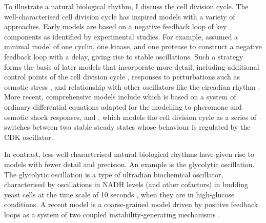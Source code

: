 To illustrate a natural biological rhythm, I discuss the cell division cycle.
The well-characterised cell division cycle has inspired models with a variety of approaches.
Early models are based on a negative feedback loop of key components as identified by experimental studies.
For example, \textcite{goldbeterMinimalCascadeModel1991} assumed a minimal model of one cyclin, one kinase, and one protease to construct a negative feedback loop with a delay, giving rise to stable oscillations.
Such a strategy forms the basis of later models that incorporate more detail, including additional control points of the cell division cycle \parencite{chenIntegrativeAnalysisCell2004}, responses to perturbations such as osmotic stress \parencite{adroverTimeDependentQuantitativeMulticomponent2011}, and relationship with other oscillators like the circadian rhythm \parencite{gerardEntrainmentMammalianCell2012, charvinForcedPeriodicExpression2009, droinLowdimensionalDynamicsTwo2019}.
More recent, comprehensive models include \textcite{adlerYeastCellCycle2022} which is based on a system of ordinary differential equations adapted for the modelling to pheromone and osmotic shock responses, and \textcite{novakMitoticKinaseOscillation2022}, which models the cell division cycle as a series of switches between two stable steady states whose behaviour is regulated by the CDK oscillator.

In contrast, less well-characterised natural biological rhythms have given rise to models with fewer detail and precision.
An example is the glycolytic oscillation.
The glycolytic oscillation is a type of ultradian biochemical oscillator, characterised by oscillations in NADH levels (and other cofactors) in budding yeast cells at the time scale of 10 seconds \parencite{doddLiveCellImaging2017, lloydSaccharomycesCerevisiaeOscillatory2019, olsenOscillationsYeastGlycolysis2021}, when they are in high-glucose conditions.
A recent model is a coarse-grained model
driven by positive feedback loops as a system of two coupled instability-generating mechanisms \parencite{goldbeterMultisynchronizationOtherPatterns}.

